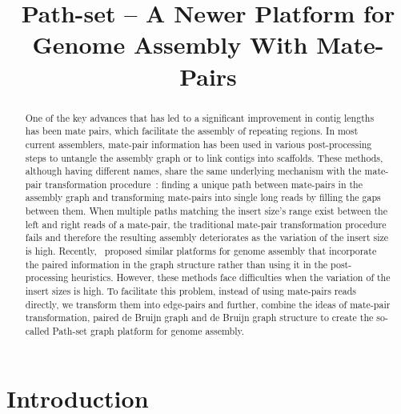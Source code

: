 \documentclass[12pt,a4paper,oneside]{article}
\title{Path-set -- A Newer Platform for Genome Assembly With Mate-Pairs}
\begin{document}
\maketitle

\begin{abstract}


One of the key advances that has led to a significant improvement 
in contig lengths has been mate pairs, which facilitate the assembly of repeating regions. 
In most current assemblers, mate-pair information has been used 
in  various post-processing steps to untangle the assembly graph or to link contigs
into scaffolds. These methods, although having different names, share the same
underlying mechanism with the mate-pair transformation procedure~\cite{Pevzner01b}:  finding a unique path between mate-pairs in the assembly graph and transforming 
mate-pairs into single long reads by filling the gaps between them. 
When multiple paths matching the insert size's range  exist between the left and right reads of a mate-pair,
 the traditional mate-pair transformation procedure fails and therefore the resulting assembly deteriorates as 
the variation of the insert size is high. 
Recently,~\cite{Medvedev11, Donmez11, Chikhi11} proposed similar platforms for genome assembly that incorporate 
the paired information in the graph structure rather than using it in the post-processing heuristics. However,
these methods face difficulties when the variation of the insert sizes is high. 
To facilitate this problem, instead of using mate-pairs reads directly, we transform them into 
edge-pairs and further, combine the ideas of mate-pair transformation, paired de Bruijn graph and 
de Bruijn graph structure to create the so-called Path-set graph platform for genome assembly.

\end{abstract}
\section{Introduction}
\end{document}
